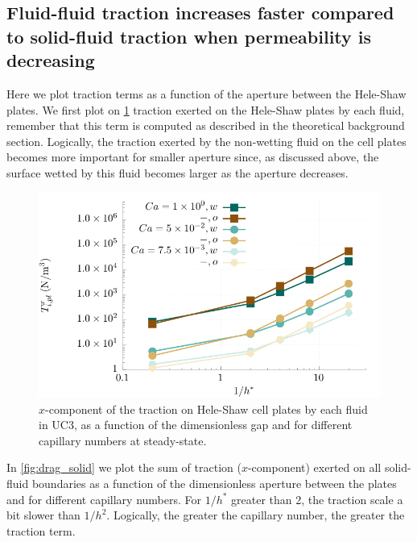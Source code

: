 \documentclass[]{article}
\begin{document}
\hypertarget{fluid-fluid-traction-increases-faster-compared-to-solid-fluid-traction-when-permeability-is-decreasing}{%
\subsection{Fluid-fluid traction increases faster compared to
solid-fluid traction when permeability is
decreasing}\label{fluid-fluid-traction-increases-faster-compared-to-solid-fluid-traction-when-permeability-is-decreasing}}

Here we plot traction terms as a function of the aperture between the
Hele-Shaw plates. We first plot on \cref{fig:drag_plates} traction
exerted on the Hele-Shaw plates by each fluid, remember that this term
is computed as described in the theoretical background section.
Logically, the traction exerted by the non-wetting fluid on the cell
plates becomes more important for smaller aperture since, as discussed
above, the surface wetted by this fluid becomes larger as the aperture
decreases.

\begin{figure}
\hypertarget{fig:drag_plates}{%
\centering
\includegraphics{figures/pdf/dragPlates.pdf}
\caption{\(x\)-component of the traction on Hele-Shaw cell plates by
each fluid in UC3, as a function of the dimensionless gap and for
different capillary numbers at steady-state.}\label{fig:drag_plates}
}
\end{figure}

In \cref{fig:drag_solid} we plot the sum of traction (\(x\)-component)
exerted on all solid-fluid boundaries as a function of the dimensionless
aperture between the plates and for different capillary numbers. For
\(1/h^*\) greater than 2, the traction scale a bit slower than
\(1/h^2\). Logically, the greater the capillary number, the greater the
traction term.
\end{document}
